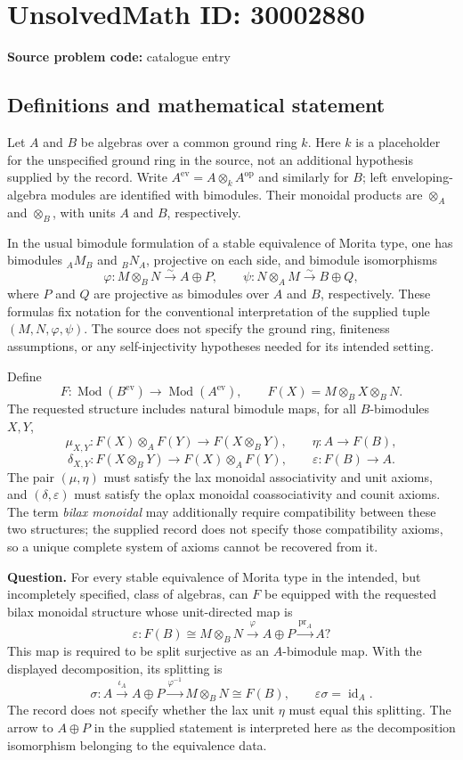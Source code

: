 \documentclass[11pt]{article}
\begin{document}
\section*{UnsolvedMath ID: 30002880}
\textbf{Source problem code:} catalogue entry
\subsection{Definitions and mathematical statement}
Let \(A\) and \(B\) be algebras over a common ground ring \(k\). Here \(k\) is a placeholder for the unspecified ground ring in the source, not an additional hypothesis supplied by the record. Write \(A^{\mathrm{ev}}=A\otimes_k A^{\mathrm{op}}\) and similarly for \(B\); left enveloping-algebra modules are identified with bimodules. Their monoidal products are \(\otimes_A\) and \(\otimes_B\), with units \(A\) and \(B\), respectively.

In the usual bimodule formulation of a stable equivalence of Morita type, one has bimodules \({}_A M_B\) and \({}_B N_A\), projective on each side, and bimodule isomorphisms
\[
\varphi:M\otimes_B N\xrightarrow{\sim}A\oplus P,
\qquad
\psi:N\otimes_A M\xrightarrow{\sim}B\oplus Q,
\]
where \(P\) and \(Q\) are projective as bimodules over \(A\) and \(B\), respectively. These formulas fix notation for the conventional interpretation of the supplied tuple \((M,N,\varphi,\psi)\). The source does not specify the ground ring, finiteness assumptions, or any self-injectivity hypotheses needed for its intended setting.

Define
\[
F:\operatorname{Mod}(B^{\mathrm{ev}})\longrightarrow\operatorname{Mod}(A^{\mathrm{ev}}),
\qquad F(X)=M\otimes_B X\otimes_B N.
\]
The requested structure includes natural bimodule maps, for all \(B\)-bimodules \(X,Y\),
\[
\mu_{X,Y}:F(X)\otimes_A F(Y)\longrightarrow F(X\otimes_B Y),
\qquad \eta:A\longrightarrow F(B),
\]
\[
\delta_{X,Y}:F(X\otimes_B Y)\longrightarrow F(X)\otimes_A F(Y),
\qquad \varepsilon:F(B)\longrightarrow A.
\]
The pair \((\mu,\eta)\) must satisfy the lax monoidal associativity and unit axioms, and \((\delta,\varepsilon)\) must satisfy the oplax monoidal coassociativity and counit axioms. The term \emph{bilax monoidal} may additionally require compatibility between these two structures; the supplied record does not specify those compatibility axioms, so a unique complete system of axioms cannot be recovered from it.

\textbf{Question.} For every stable equivalence of Morita type in the intended, but incompletely specified, class of algebras, can \(F\) be equipped with the requested bilax monoidal structure whose unit-directed map is
\[
\varepsilon:
F(B)\cong M\otimes_B N
\xrightarrow{\varphi}A\oplus P
\xrightarrow{\operatorname{pr}_A}A?
\]
This map is required to be split surjective as an \(A\)-bimodule map. With the displayed decomposition, its splitting is
\[
\sigma:A\xrightarrow{\iota_A}A\oplus P
\xrightarrow{\varphi^{-1}}M\otimes_B N\cong F(B),
\qquad \varepsilon\sigma=\operatorname{id}_A.
\]
The record does not specify whether the lax unit \(\eta\) must equal this splitting. The arrow to \(A\oplus P\) in the supplied statement is interpreted here as the decomposition isomorphism belonging to the equivalence data.
\end{document}
